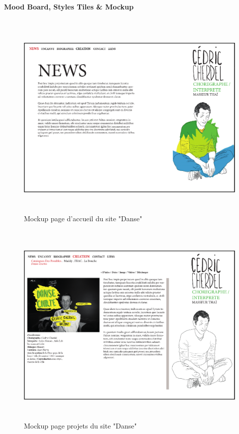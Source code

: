\documentclass[11pt,a4paper]{report}
\begin{document}
			\paragraph*{Mood Board, Styles Tiles \& Mockup}\subparagraph*{}
				\begin{figure}[H]
					\centering
					\includegraphics[height=10cm]{Mockup-Danse_1.eps}
					\caption{Mockup page d'accueil du site "Danse"}
					\label{fig:Mockup-Danse_1}
				\end{figure}
				\begin{figure}[H]
					\centering
					\includegraphics[height=10cm]{Mockup-Danse_2.eps}
					\caption{Mockup page projets du site "Danse"}
					\label{fig:Mockup-Danse_2}
				\end{figure}
\end{document}
